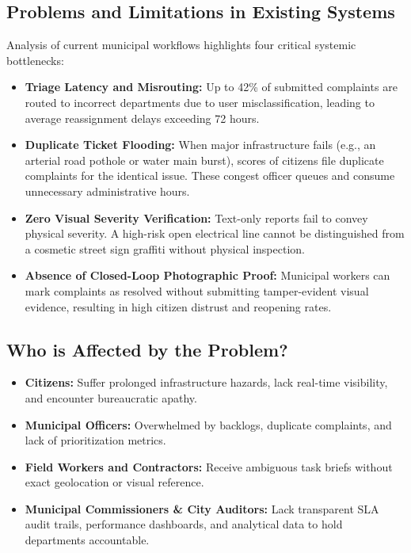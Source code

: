 \documentclass[11pt,a4paper]{article}
\begin{document}
\subsection{Problems and Limitations in Existing Systems}
Analysis of current municipal workflows highlights four critical systemic bottlenecks:
\begin{itemize}[leftmargin=1.5em]
    \item \textbf{Triage Latency and Misrouting:} Up to 42\% of submitted complaints are routed to incorrect departments due to user misclassification, leading to average reassignment delays exceeding 72 hours.
    \item \textbf{Duplicate Ticket Flooding:} When major infrastructure fails (e.g., an arterial road pothole or water main burst), scores of citizens file duplicate complaints for the identical issue. These congest officer queues and consume unnecessary administrative hours.
    \item \textbf{Zero Visual Severity Verification:} Text-only reports fail to convey physical severity. A high-risk open electrical line cannot be distinguished from a cosmetic street sign graffiti without physical inspection.
    \item \textbf{Absence of Closed-Loop Photographic Proof:} Municipal workers can mark complaints as resolved without submitting tamper-evident visual evidence, resulting in high citizen distrust and reopening rates.
\end{itemize}

\subsection{Who is Affected by the Problem?}
\begin{itemize}[leftmargin=1.5em]
    \item \textbf{Citizens:} Suffer prolonged infrastructure hazards, lack real-time visibility, and encounter bureaucratic apathy.
    \item \textbf{Municipal Officers:} Overwhelmed by backlogs, duplicate complaints, and lack of prioritization metrics.
    \item \textbf{Field Workers and Contractors:} Receive ambiguous task briefs without exact geolocation or visual reference.
    \item \textbf{Municipal Commissioners \& City Auditors:} Lack transparent SLA audit trails, performance dashboards, and analytical data to hold departments accountable.
\end{itemize}
\end{document}
